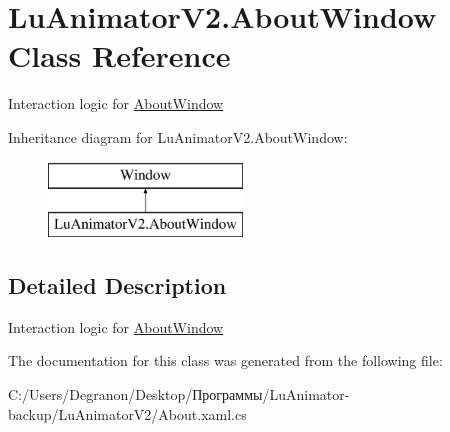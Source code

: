 \hypertarget{class_lu_animator_v2_1_1_about_window}{}\section{Lu\+Animator\+V2.\+About\+Window Class Reference}
\label{class_lu_animator_v2_1_1_about_window}


Interaction logic for \hyperlink{class_lu_animator_v2_1_1_about_window}{About\+Window}  


Inheritance diagram for Lu\+Animator\+V2.\+About\+Window\+:\begin{figure}[H]
\begin{center}
\leavevmode
\includegraphics[height=2.000000cm]{class_lu_animator_v2_1_1_about_window}
\end{center}
\end{figure}


\subsection{Detailed Description}
Interaction logic for \hyperlink{class_lu_animator_v2_1_1_about_window}{About\+Window} 



The documentation for this class was generated from the following file\+:\begin{DoxyCompactItemize}
\item 
C\+:/\+Users/\+Degranon/\+Desktop/Программы/\+Lu\+Animator-\/backup/\+Lu\+Animator\+V2/About.\+xaml.\+cs\end{DoxyCompactItemize}
